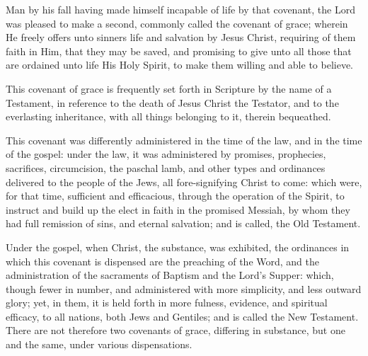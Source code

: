 \begin{outerlst}[left=0pt,labelsep=0pt]
\begin{innerlst}[resume*]
\item Man by his fall having made himself incapable of life by that covenant, the Lord was pleased to make a second, commonly called the covenant of grace; wherein He freely offers unto sinners life and salvation by Jesus Christ, requiring of them faith in Him, that they may be saved, and promising to give unto all those that are ordained unto life His Holy Spirit, to make them willing and able to believe.   

\item This covenant of grace is frequently set forth in Scripture by the name of a Testament, in reference to the death of Jesus Christ the Testator, and to the everlasting inheritance, with all things belonging to it, therein bequeathed.   

\item This covenant was differently administered in the time of the law, and in the time of the gospel: under the law, it was administered by promises, prophecies, sacrifices, circumcision, the paschal lamb, and other types and ordinances delivered to the people of the Jews, all fore-signifying Christ to come: which were, for that time, sufficient and efficacious, through the operation of the Spirit, to instruct and build up the elect in faith in the promised Messiah, by whom they had full remission of sins, and eternal salvation; and is called, the Old Testament.   

\item Under the gospel, when Christ, the substance, was exhibited, the ordinances in which this covenant is dispensed are the preaching of the Word, and the administration of the sacraments of Baptism and the Lord's Supper: which, though fewer in number, and administered with more simplicity, and less outward glory; yet, in them, it is held forth in more fulness, evidence, and spiritual efficacy, to all nations, both Jews and Gentiles; and is called the New Testament. There are not therefore two covenants of grace, differing in substance, but one and the same, under various dispensations.  
\end{innerlst}


\end{outerlst}
